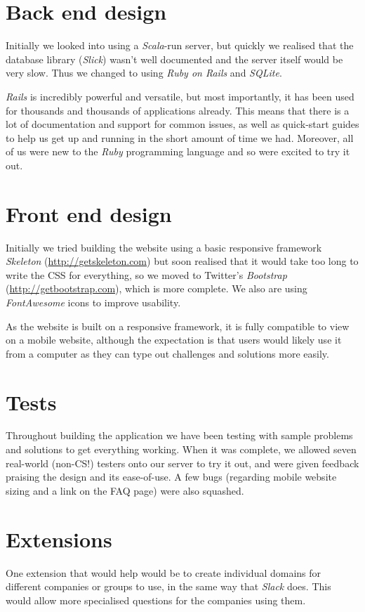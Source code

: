 \documentclass{report}
\begin{document}
\section{Back end design}
Initially we looked into using a \emph{Scala}-run server, but quickly we realised that the database library (\emph{Slick}) wasn’t well documented and the server itself would be very slow. Thus we changed to using \emph{Ruby on Rails} and \emph{SQLite}.

\emph{Rails} is incredibly powerful and versatile, but most importantly, it has been used for thousands and thousands of applications already. This means that there is a lot of documentation and support for common issues, as well as quick-start guides to help us get up and running in the short amount of time we had. Moreover, all of us were new to the \emph{Ruby} programming language and so were excited to try it out.

\section{Front end design}
Initially we tried building the website using a basic responsive framework \emph{Skeleton} (\url{http://getskeleton.com}) but soon realised that it would take too long to write the CSS for everything, so we moved to Twitter’s \emph{Bootstrap} (\url{http://getbootstrap.com}), which is more complete. We also are using \emph{FontAwesome} icons to improve usability.

As the website is built on a responsive framework, it is fully compatible to view on a mobile website, although the expectation is that users would likely use it from a computer as they can type out challenges and solutions more easily.


\section{Tests}
Throughout building the application we have been testing with sample problems and solutions to get everything working. When it was complete, we allowed seven real-world (non-CS!) testers onto our server to try it out, and were given feedback praising the design and its ease-of-use. A few bugs (regarding mobile website sizing and a link on the FAQ page) were also squashed.

\section{Extensions}
One extension that would help would be to create individual domains for different companies or groups to use, in the same way that \emph{Slack} does. This would allow more specialised questions for the companies using them.
\end{document}
